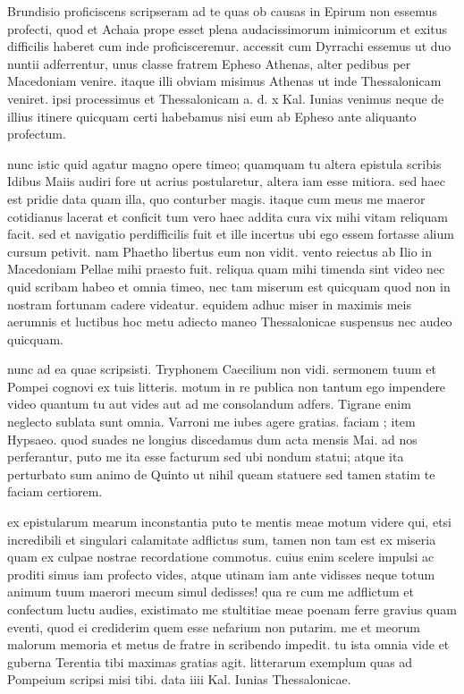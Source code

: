 


 Brundisio proficiscens scripseram ad te quas ob causas in Epirum non essemus profecti, quod et Achaia prope esset plena audacissimorum inimicorum et exitus difficilis haberet cum inde proficisceremur. accessit cum Dyrrachi essemus ut duo nuntii adferrentur, unus classe fratrem Epheso Athenas, alter pedibus per Macedoniam venire. itaque illi obviam misimus Athenas ut inde Thessalonicam veniret. ipsi processimus et Thessalonicam a. d. x Kal. Iunias venimus neque de illius itinere quicquam certi habebamus nisi eum ab Epheso ante aliquanto profectum.

 nunc istic quid agatur magno opere timeo; quamquam tu altera epistula scribis Idibus Maiis audiri fore ut acrius postularetur, altera iam esse mitiora. sed haec est pridie data quam illa, quo conturber magis. itaque cum meus me maeror cotidianus lacerat et conficit tum vero haec addita cura vix mihi vitam reliquam facit. sed et navigatio perdifficilis fuit et ille incertus ubi ego essem fortasse alium cursum petivit. nam Phaetho libertus eum non vidit. vento reiectus ab Ilio in Macedoniam Pellae mihi praesto fuit. reliqua quam mihi timenda sint video nec quid scribam habeo et omnia timeo, nec tam miserum est quicquam quod non in nostram fortunam cadere videatur. equidem adhuc miser in maximis meis aerumnis et luctibus hoc metu adiecto maneo Thessalonicae suspensus nec audeo quicquam.

 nunc ad ea quae scripsisti. Tryphonem Caecilium non vidi. sermonem tuum et Pompei cognovi ex tuis litteris. motum in re publica non tantum ego impendere video quantum tu aut vides aut ad me consolandum adfers. Tigrane enim neglecto sublata sunt omnia. Varroni me iubes agere gratias. faciam ; item Hypsaeo. quod suades ne longius discedamus dum acta mensis Mai. ad nos perferantur, puto me ita esse facturum sed ubi nondum statui; atque ita perturbato sum animo de Quinto ut nihil queam statuere sed tamen statim te faciam certiorem.

 ex epistularum mearum inconstantia puto te mentis meae motum videre qui, etsi incredibili et singulari calamitate adflictus sum, tamen non tam est ex miseria quam ex culpae nostrae recordatione commotus. cuius enim scelere impulsi ac proditi simus iam profecto vides, atque utinam iam ante vidisses neque totum animum tuum maerori mecum simul dedisses! qua re cum me adflictum et confectum luctu audies, existimato me stultitiae meae poenam ferre gravius quam eventi, quod ei crediderim quem esse nefarium non putarim. me et meorum malorum memoria et metus de fratre in scribendo impedit. tu ista omnia vide et guberna Terentia tibi maximas gratias agit. litterarum exemplum quas ad Pompeium scripsi misi tibi. data iiii Kal. Iunias Thessalonicae.
